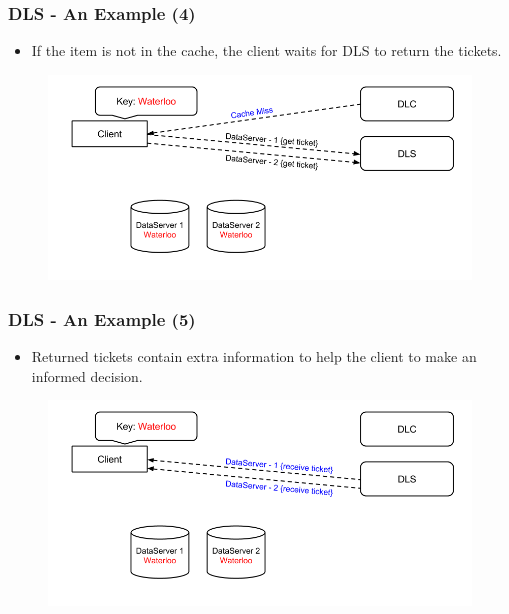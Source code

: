 \documentclass{beamer}
\begin{document}
\begin{frame}
  \frametitle{DLS - An Example (4)}
  \begin{itemize}
  \item If the item is not in the cache, the client waits for DLS to
    return the tickets.
  \end{itemize}
  \begin{figure}
    \begin{center}
      \centerline{\includegraphics[scale=0.40]{img/DLS_Example04.png}}
    \end{center}
  \end{figure}
\end{frame}


\begin{frame}
  \frametitle{DLS - An Example (5)}
  \begin{itemize}
  \item Returned tickets contain extra information to help the client to make
    an informed decision.
  \end{itemize}
  \begin{figure}
    \begin{center}
      \centerline{\includegraphics[scale=0.40]{img/DLS_Example05.png}}
    \end{center}
  \end{figure}
\end{frame}
\end{document}
